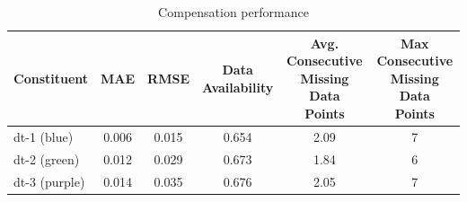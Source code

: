 \begin{table}[htp]
\centering
\caption{Compensation performance}
\label{tab:disturbance-metrics}
\begin{tabular}{lccccc}
\toprule
Constituent & MAE & RMSE & \makecell{Data \\ Availability} 
& \makecell{Avg. Consecutive \\ Missing Data \\ Points} 
& \makecell{Max Consecutive \\ Missing Data \\ Points} \\
\midrule
dt-1 (blue) & 0.006 & 0.015 & 0.654 & 2.09 & 7 \\
dt-2 (green) & 0.012 & 0.029 & 0.673 & 1.84 & 6 \\
dt-3 (purple) & 0.014 & 0.035 & 0.676 & 2.05 & 7 \\
\bottomrule
\end{tabular}
\end{table}